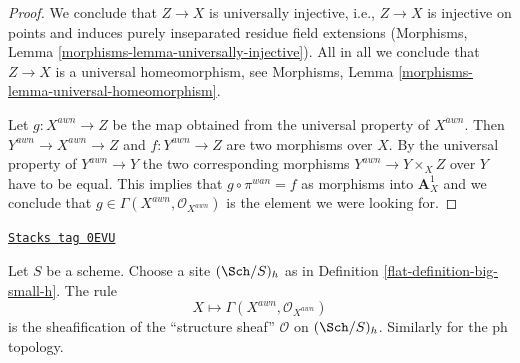 \begin{proof}
\medskip\noindent
We conclude that $Z \to X$ is universally injective, i.e.,
$Z \to X$ is injective on points and induces
purely inseparated residue field extensions
(Morphisms, Lemma \ref{morphisms-lemma-universally-injective}).
All in all we conclude that $Z \to X$ is a universal homeomorphism, see
Morphisms, Lemma \ref{morphisms-lemma-universal-homeomorphism}.

\medskip\noindent
Let $g : X^{awn} \to Z$ be the map obtained from the universal property
of $X^{awn}$. Then $Y^{awn} \to X^{awn} \to Z$ and $f : Y^{awn} \to Z$
are two morphisms over $X$. By the universal property of
$Y^{awn} \to Y$ the two corresponding morphisms
$Y^{awn} \to Y \times_X Z$ over $Y$ have to be equal. This implies
that $g \circ \pi^{wan} = f$ as morphisms into $\mathbf{A}^1_X$
and we conclude that $g \in \Gamma(X^{awn}, \mathcal{O}_{X^{awn}})$
is the element we were looking for.
\end{proof}

\begin{lemma}
\label{flat-lemma-weak-normalization-h-sheaf}
\href{https://stacks.math.columbia.edu/tag/0EVU}{\texttt{Stacks tag 0EVU}}

Let $S$ be a scheme. Choose a site $(\Sch/S)_h$
as in Definition \ref{flat-definition-big-small-h}.
The rule
$$
X \longmapsto \Gamma(X^{awn}, \mathcal{O}_{X^{awn}})
$$
is the sheafification of the ``structure sheaf'' $\mathcal{O}$
on $(\Sch/S)_h$. Similarly for the ph topology.
\end{lemma}


